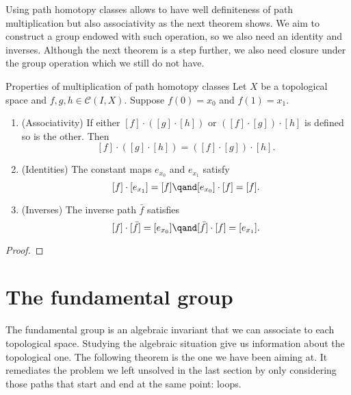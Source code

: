 Using path homotopy  classes allows to have well definiteness of path multiplication but also  associativity as the next theorem shows. We aim to construct a group endowed with such operation, so we also need an identity and inverses. Although the next theorem is a step further, we also need closure under the group operation which we still do not have.


\begin{theorem}{Properties of multiplication of  path homotopy classes}{}
    Let \(X\) be a topological space and \(f,g,h\in \mathcal{C}(I,X)\). Suppose \(f(0)=x_0\)  and \(f(1) = x_1\).
\begin{enumerate}[label=(\roman*)]
    \item (Associativity) If either \([f]\cdot ([g]\cdot [h])\) or \(([f]\cdot [g])\cdot [h]\) is defined so is the other. Then \[[f]\cdot ([g]\cdot [h]) = ([f]\cdot [g])\cdot [h].\]
    
    \item (Identities) The constant maps \(e_{x_0}\) and \(e_{x_1}\) satisfy \[
        [f]\cdot [e_{x_1}] = [f]\qand [e_{x_0}]\cdot [f] = [f].
    \]
    
    \item (Inverses) The inverse path \(\bar{f}\) satisfies \[
        [f]\cdot [\bar{f}] = [e_{x_0}] \qand [\bar{f}]\cdot [f] = [e_{x_1}].
    \]
\end{enumerate}
\end{theorem}

\begin{proof}
    
\end{proof}


\section{The fundamental group}

The fundamental group is  an algebraic invariant that we can  associate to each  topological space. Studying the algebraic situation give us information about the topological one.   The following theorem is the one we have been aiming at. It remediates the problem we left unsolved in the last section by only considering those paths that start and end at the same point: loops. 







